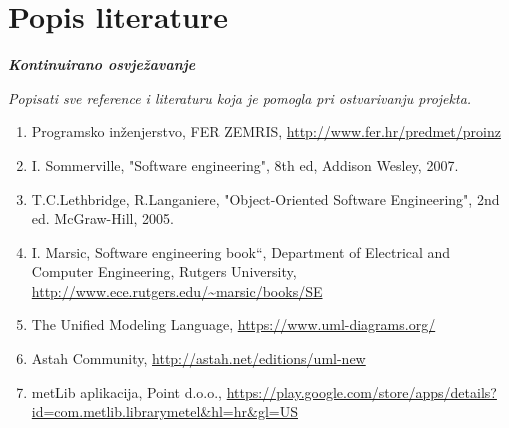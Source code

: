 \chapter*{Popis literature}
	 	
 		\textbf{\textit{Kontinuirano osvježavanje}}
	
		\textit{Popisati sve reference i literaturu koja je pomogla pri ostvarivanju projekta.}
		
		
		\begin{enumerate}
			
			
			\item  Programsko inženjerstvo, FER ZEMRIS, \url{http://www.fer.hr/predmet/proinz}
			
			\item  I. Sommerville, "Software engineering", 8th ed, Addison Wesley, 2007.
			
			\item  T.C.Lethbridge, R.Langaniere, "Object-Oriented Software Engineering", 2nd ed. McGraw-Hill, 2005.
			
			\item  I. Marsic, Software engineering book``, Department of Electrical and Computer Engineering, Rutgers University, \url{http://www.ece.rutgers.edu/~marsic/books/SE}
			
			\item  The Unified Modeling Language, \url{https://www.uml-diagrams.org/}
			
			\item  Astah Community, \url{http://astah.net/editions/uml-new}
			
			\item  metLib aplikacija, Point d.o.o., \url{https://play.google.com/store/apps/details?id=com.metlib.librarymetel&hl=hr&gl=US}
			
		\end{enumerate}
		
		 